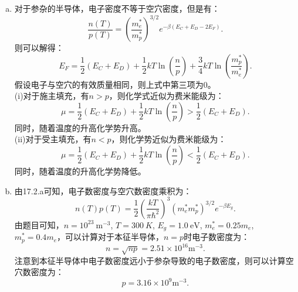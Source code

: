 \documentclass[reqno,a4paper,12pt]{amsart}
\begin{document}
\begin{enumerate}[1.]
\begin{tcolorbox}[breakable, colframe = black, colback = black!5!white]
\begin{enumerate}[(a)]
\item 对于参杂的半导体，电子密度不等于空穴密度，但是有：
\[
	\frac{n(T)}{p(T)} = \left( \frac{m_e^*}{m_p^*} \right)^{3/2} e^{-\beta(E_C+E_D-2E_F)}.
\]
则可以解得：
\[
	E_F = \frac{1}{2}(E_C+E_D) + \frac{1}{2}kT\ln\left( \frac{n}{p} \right) + \frac{3}{4} kT \ln\left( \frac{m_p^*}{m_e^*} \right).
\]
假设电子与空穴的有效质量相同，则上式中第三项为0。\\
(i)对于施主填充，有$n>p$，则化学式近似为费米能级为：
\[
	\mu = \frac{1}{2}(E_C+E_D) + \frac{1}{2}kT\ln\left( \frac{n}{p} \right) > \frac{1}{2}(E_C+E_D).
\]
同时，随着温度的升高化学势升高。 \\
(ii)对于受主填充，有$n<p$，则化学势近似为费米能级为：
\[
	\mu = \frac{1}{2}(E_C+E_D) + \frac{1}{2}kT\ln\left( \frac{n}{p} \right) < \frac{1}{2}(E_C+E_D).
\]
同时，随着温度的升高化学势降低。

\item 由17.2.a可知，电子数密度与空穴数密度乘积为：
\[
	n(T)p(T) = \frac{1}{2} \left( \frac{kT}{\pi\hbar^2} \right)^3 (m_e^*m_p^*)^{3/2} e^{-\beta E_g}.
\]
由题目可知，$n = 10^{23}~\text{m}^{-3}$, $T = 300~K$, $E_g = 1.0 ~ \text{eV}$, $m_e^* = 0.25m_e$, $m_p^* = 0.4m_e$，可以计算对于本征半导体，$n = p$时电子数密度为：
\[
	n = \sqrt{np} = 2.51 \times 10^{16} \text{m}^{-3}.
\]
注意到本征半导体中电子数密度远小于参杂导致的电子数密度，则可以计算空穴数密度为：
\[
	p = 3.16\times 10^9 \text{m}^{-3}.
\]

\end{enumerate}
\end{tcolorbox}


\end{enumerate}
\end{document}
